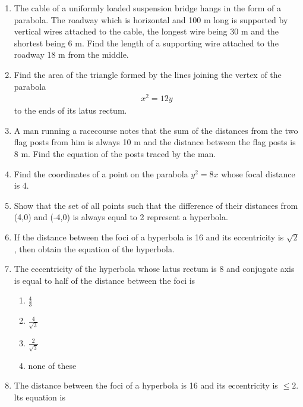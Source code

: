 \begin{enumerate}[label=\thesubsection.\arabic*,ref=\thesubsection.\theenumi]
\item  The cable of a uniformly loaded suspension bridge hangs in the form of a parabola. The roadway which is horizontal and 100 m long is supported by vertical wires attached to the cable, the longest wire being 30 m and the shortest being 6 m. Find the length of a supporting wire attached to the roadway 18 m from the middle.
\label{chapters/11/11/5/3}
\\
\solution

    \item Find the area of the triangle formed by the lines joining the vertex 
    of the parabola 
    \begin{align}
        x^2 = 12y
        \label{eq:chapters/11/11/5/6/parabola}
    \end{align}
    to the ends of its latus rectum.
\label{chapters/11/11/5/6}
\\
\solution

\item A man running a racecourse notes that the sum of the distances from the two flag posts from him is always 10 m and the distance between the flag posts is 8 m. Find the equation of the posts traced by the man. 
\label{chapters/11/11/5/7}
 \item Find the coordinates of a point on the parabola $y^2=8x$ whose focal distance is 4.
\item Show that the set of all points such that the difference of their distances from (4,0) and (-4,0) is always equal to 2 represent a hyperbola.
\item If the distance between the foci of a hyperbola is 16 and its eccentricity is $\sqrt{2}$, then obtain the equation of the hyperbola.
\item The eccentricity of the hyperbola whose latus rectum is 8 and conjugate axis is equal to half of the distance between the foci is 
\begin{enumerate}
\item $\frac{4}{3}$
\item $\frac{4}{\sqrt{3}}$
\item $\frac{2}{\sqrt{3}}$
\item none of these
\end{enumerate}
\item The distance between the foci of a hyperbola is 16 and its eccentricity is $\le{2}$. lts equation is
\begin{enumerate}

\end{enumerate}
\end{enumerate}
